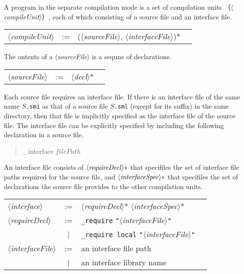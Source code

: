 \documentclass{jbook}
\newcommand{\vbar}{\mbox{\ $|$\ }}
\newcommand{\nonterm}[1]{\mbox{$\langle$}{\it #1}\mbox{$\rangle$}}
\newcommand{\term}[1]{\mbox{{\tt #1}}}
\newenvironment{program}{\begin{quote}\begin{tt}}%
                        {\end{tt}\end{quote}}
\begin{document}
\else%
	A program in the separate compilation mode is a set of 
compilation units （\nonterm{compileUnit}）, each of which consisting
of a source file and an interface file.

\begin{center}
\begin{tabular}{lcll}
\nonterm{compileUnit} &:=& (\nonterm{sourceFile}, \nonterm{interfaceFile})*
\end{tabular}
\end{center}

	The ontents of a \nonterm{sourceFile} is a sequne of declarations.

\begin{center}
\begin{tabular}{lcll}
\nonterm{sourceFile} &:=& \nonterm{decl}*
\end{tabular}
\end{center}

	Each source file requires an interface file.
	If there is an interface file of the same name 
\mbox{\tt $S$.smi} as that of a source file \mbox{\tt $S$.sml} (except
for its suffix) in the same directory, then that file is implicitly
specified as the interface file of the source file.
	The interface file can be explicitly specified by including the
following declaration in a source file.

\begin{program}
\_interface $filePath$
\end{program}

	An interface file consists of $\nonterm{requireDecl}*$ that 
specifiles the set of interface file paths required for the source file, 
and $\nonterm{interfaceSpec}*$ that specifiles the set of declarations 
the source file provides to the other compilation units.

\begin{center}
\begin{tabular}{lcll}
\nonterm{interface} &:=& \nonterm{requireDecl}* \nonterm{interfaceSpec}*
\\
\nonterm{requireDecl} &:=& \term{\_require} \term{"}\nonterm{interfaceFile}\term{"}\\

&\vbar& \term{\_require local} \term{"}\nonterm{interfaceFile}\term{"}
\\
\nonterm{interfaceFile} &:=& an interface file path\\
                        &\vbar& an interface library name
\end{tabular}
\end{center}
\end{document}
